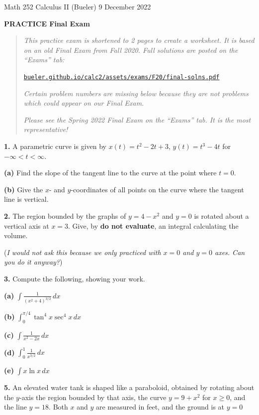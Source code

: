 \documentclass[11pt]{amsart}
\newcommand{\prob}[1]{\bigskip\bigskip\noindent\textbf{#1.}\quad }
\newcommand{\epart}[1]{\bigskip\noindent\textbf{(#1)}\quad }
\newcommand{\ds}{\displaystyle}
\begin{document}
\scriptsize \noindent Math 252 Calculus II (Bueler) \hfill 9 December 2022 
\normalsize\medskip

\Large\centerline{\textbf{PRACTICE Final Exam}}
\medskip
\normalsize

\thispagestyle{empty}
\begin{quote}
\emph{This practice exam is shortened to 2 pages to create a worksheet.  It is based on an old Final Exam from Fall 2020.  Full solutions are posted on the ``Exams'' tab:}

\centerline{\href{https://bueler.github.io/calc2/assets/exams/F20/final-solns.pdf}{\texttt{bueler.github.io/calc2/assets/exams/F20/final-solns.pdf}}}

\noindent \emph{Certain problem numbers are missing below because they are \emph{not} problems which could appear on our Final Exam.}

\emph{Please see the Spring 2022 Final Exam on the ``Exams'' tab.  It is the most representative!}
\end{quote}

\prob{1}  A parametric curve is given by $\ds x(t)=t^2-2t+3$, $\ds y(t)=t^3-4t$ for $-\infty<t<\infty$.

\epart{a}  Find the slope of the tangent line to the curve at the point where $t=0$.

\epart{b}  Give the $x$- and $y$-coordinates of all points on the curve where the tangent line is vertical.

\prob{2} The region bounded by the graphs of $y=4-x^2$ and $y=0$ is rotated about a vertical axis at $x=3$.  Give, by \textbf{do not evaluate}, an integral calculating the volume.

\noindent (\emph{I would not ask this because we only practiced with $x=0$ and $y=0$ axes.  Can you do it anyway?})

\prob{3}  Compute the following, showing your work.

\epart{a}  $\ds \int \frac{1}{(x^2+4)^{3/2}}\,dx$

\epart{b}  $\ds \int_0^{\pi/4} \tan^4 x \sec^4 x\,dx$

\epart{c}  $\ds \int \frac{1}{x^2-2x}\,dx$

\epart{d}  $\ds \int_0^1 \frac{1}{x^{3/2}}\,dx$

\epart{e}  $\ds \int x \ln x\,dx$

\prob{5}  An elevated water tank is shaped like a paraboloid, obtained by rotating about the $y$-axis the region bounded by that axis, the curve $y=9+x^2$ for $x\ge 0$, and the line $y=18$.  Both $x$ and $y$ are measured in feet, and the ground is at $y=0$
\end{document}
